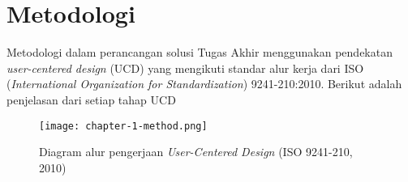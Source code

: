 \section{Metodologi}
\label{sec:metodologi}

Metodologi dalam perancangan solusi Tugas Akhir menggunakan pendekatan \textit{user-centered design} (UCD) yang mengikuti standar alur kerja dari ISO (\textit{International Organization for Standardization}) 9241-210:2010. Berikut adalah penjelasan dari setiap tahap UCD


\begin{figure}[h]
  \centering
  \texttt{[image: chapter-1-method.png]}
  \caption{Diagram alur pengerjaan \textit{User-Centered Design} (ISO 9241-210, 2010)}
  \label{fig:diagram_iso1}
\end{figure}

